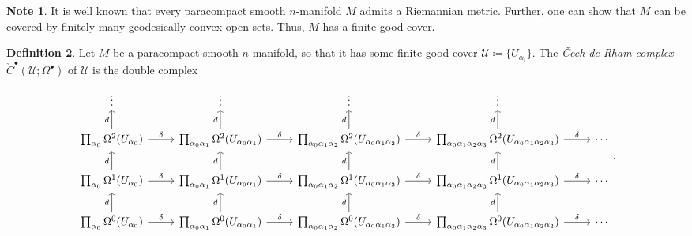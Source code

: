 \documentclass[10pt,letterpaper,cm]{nupset}
\theoremstyle{definition}
\newtheorem{definition}{Definition}[subsection]
\newtheorem{note}[definition]{Note}
\theoremstyle{theorem}
\theoremstyle{remark}
\newcommand{\U}{\mathcal U}
\newcommand{\1}{\mathbb{1}}
\newcommand{\0}{\vec 0}
\begin{document}
\begin{note}
It is well known that every paracompact smooth $n$-manifold $M$ admits a Riemannian metric. Further, one can show that $M$ can be covered by finitely many geodesically convex open sets. Thus, $M$ has a finite good cover. 
\end{note}

\begin{definition} Let $M$ be a paracompact smooth $n$-manifold, so that it has some finite good cover $\U \coloneqq  \{U_{\alpha_i}\}$.
The \textit{\v{C}ech-de-Rham complex $\check{C}^{\bullet}(\U; \Omega^{\bullet})$} of $\U$ is the double complex
\[
\begin{tikzcd}
\vdots                                                                    & \vdots                                                                                           & \vdots                                                                                                            & \vdots                                                                                                                                   &        \\
\prod_{\alpha_0}\Omega^2(U_{\alpha_0}) \arrow[u, "d"] \arrow[r, "\delta"] & \prod_{\alpha_0{\alpha_1}}\Omega^2(U_{\alpha_0{\alpha_1}}) \arrow[u, "d"] \arrow[r, "\delta"] & \prod_{\alpha_0{\alpha_1{\alpha_2}}}\Omega^2(U_{\alpha_0{\alpha_1{\alpha_2}}}) \arrow[u, "d"] \arrow[r, "\delta"] & \prod_{\alpha_0{\alpha_1{\alpha_2{\alpha_3}}}}\Omega^2(U_{\alpha_0{\alpha_1{\alpha_2}{\alpha_3}}}) \arrow[r, "\delta"] \arrow[u, "d"] & \cdots \\
\prod_{\alpha_0}\Omega^1(U_{\alpha_0}) \arrow[u, "d"] \arrow[r, "\delta"] & \prod_{\alpha_0{\alpha_1}}\Omega^1(U_{\alpha_0{\alpha_1}}) \arrow[u, "d"] \arrow[r, "\delta"] & \prod_{\alpha_0{\alpha_1{\alpha_2}}}\Omega^1(U_{\alpha_0{\alpha_1{\alpha_2}}}) \arrow[u, "d"] \arrow[r, "\delta"] & \prod_{\alpha_0{\alpha_1{\alpha_2{\alpha_3}}}}\Omega^1(U_{\alpha_0{\alpha_1{\alpha_2}{\alpha_3}}}) \arrow[r, "\delta"] \arrow[u, "d"] & \cdots \\
\prod_{\alpha_0}\Omega^0(U_{\alpha_0}) \arrow[r, "\delta"] \arrow[u, "d"] & \prod_{\alpha_0{\alpha_1}}\Omega^0(U_{\alpha_0{\alpha_1}}) \arrow[r, "\delta"] \arrow[u, "d"] & \prod_{\alpha_0{\alpha_1{\alpha_2}}}\Omega^0(U_{\alpha_0{\alpha_1{\alpha_2}}}) \arrow[r, "\delta"] \arrow[u, "d"] & \prod_{\alpha_0{\alpha_1{\alpha_2{\alpha_3}}}}\Omega^0(U_{\alpha_0{\alpha_1{\alpha_2}{\alpha_3}}}) \arrow[r, "\delta"] \arrow[u, "d"] & \cdots
\end{tikzcd}.
\]
\end{definition}
\end{document}
